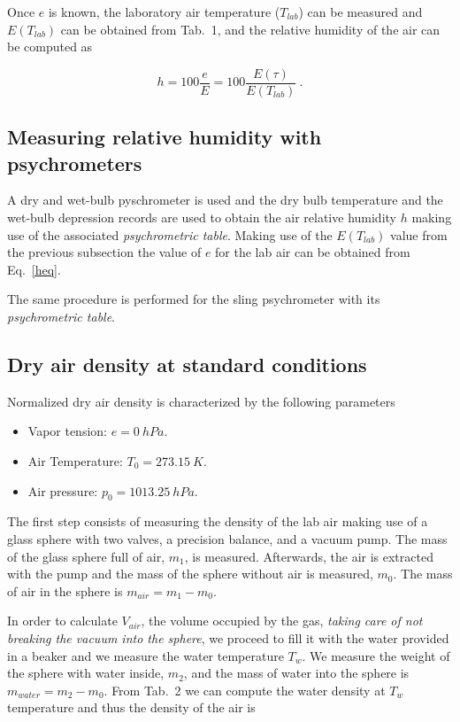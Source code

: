 \documentclass{article}
\begin{document}
Once $e$ is known, the laboratory air temperature ($T_{lab}$) can be
measured and $E(T_{lab})$ can be obtained from  Tab.\ 1, and the relative humidity of the air can be computed as 

\begin{equation}
h = 100\frac{e}{E} = 100 \frac{E(\tau)}{E(T_{lab})}~.
\label{heq}
\end{equation}

\subsection{Measuring relative humidity with psychrometers}
A dry and wet-bulb pyschrometer is used and the dry bulb temperature
and the wet-bulb depression records are used to obtain the air
relative humidity $h$ making use of the associated \textit{psychrometric
  table}. Making use of the $E(T_{lab})$ value from the previous
subsection the value of $e$ for the lab air can be obtained from Eq.\
\eqref{heq}.

The same procedure is performed for the sling psychrometer with its \textit{psychrometric
  table}.

\subsection{Dry air density at standard conditions}

Normalized dry air density is characterized by the following parameters
\begin{itemize}
\item
Vapor tension: $e = \SI{0}{hPa}$.
\item
Air Temperature: $T_0 = \SI{273.15}{K}$.
\item
Air pressure: $p_0 = \SI{1013.25}{hPa}$.
\end{itemize}

The first step consists of measuring the density of the lab air making
use of a glass sphere with two valves, a precision balance, and a
vacuum pump. The mass of the glass sphere full of air, $m_1$, is
measured. Afterwards, the air is extracted with the pump and the mass
of the sphere without air is measured, $m_0$. The mass of air in the
sphere is $m_{air} = m_1 - m_0$. 

In order to calculate $V_{air}$, the volume
occupied by the gas, \textit{taking care of not breaking the vacuum
  into the sphere}, we proceed to fill it with the water provided in a
beaker and we measure the water temperature $T_w$. We measure the
weight of the sphere with water inside, $m_2$, and the mass of water
into the sphere is $m_{water} = m_2 - m_0$. From Tab.\ 2 we can compute the water density at $T_w$
temperature and thus the density of the air is
\end{document}
